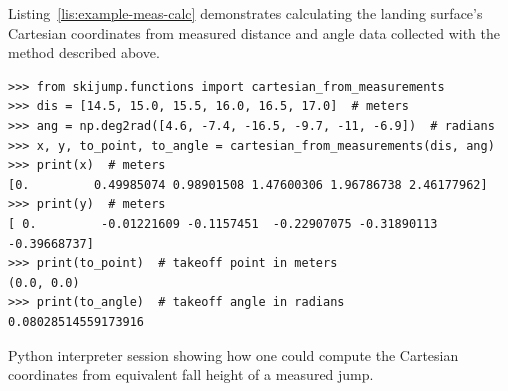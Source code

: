 \documentclass{article}
\begin{document}
Listing~\ref{lis:example-meas-calc} demonstrates calculating the landing
surface's Cartesian coordinates from measured distance and angle data collected
with the method described above.
%
\begin{listing*}
  \begin{verbatim}
>>> from skijump.functions import cartesian_from_measurements
>>> dis = [14.5, 15.0, 15.5, 16.0, 16.5, 17.0]  # meters
>>> ang = np.deg2rad([4.6, -7.4, -16.5, -9.7, -11, -6.9])  # radians
>>> x, y, to_point, to_angle = cartesian_from_measurements(dis, ang)
>>> print(x)  # meters
[0.         0.49985074 0.98901508 1.47600306 1.96786738 2.46177962]
>>> print(y)  # meters
[ 0.         -0.01221609 -0.1157451  -0.22907075 -0.31890113 -0.39668737]
>>> print(to_point)  # takeoff point in meters
(0.0, 0.0)
>>> print(to_angle)  # takeoff angle in radians
0.08028514559173916
  \end{verbatim}
  \caption{Python interpreter session showing how one could compute the
  Cartesian coordinates from equivalent fall height of a measured jump.}
  \label{lis:example-meas-calc}
\end{listing*}
\end{document}
